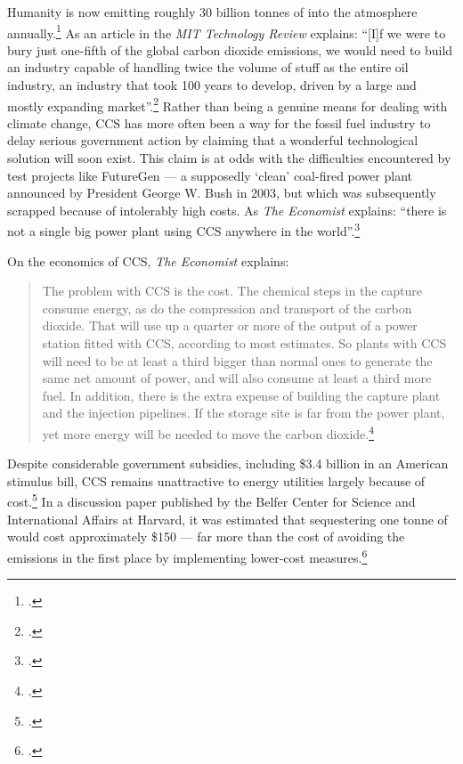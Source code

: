 \documentclass[10pt]{article}
\begin{document}
Humanity is now emitting roughly 30 billion tonnes of  into the atmosphere annually.\footcite[][]{RedrawingClimateEnergy}
As an article in the \emph{MIT Technology Review} explains: ``[I]f we were to bury just one-fifth of the global carbon dioxide emissions, we would need to build an industry capable of handling twice the volume of stuff as the entire oil industry, an industry that took 100 years to develop, driven by a large and mostly expanding market''.\footcite[][]{BullisonCCS}
Rather than being a genuine means for dealing with climate change, CCS has more often been a way for the fossil fuel industry to delay serious government action by claiming that a wonderful technological solution will soon exist.
This claim is at odds with the difficulties encountered by test projects like FutureGen --- a supposedly `clean' coal-fired power plant announced by President George W. Bush in 2003, but which was subsequently scrapped because of intolerably high costs.
As \emph{The Economist} explains: ``there is not a single big power plant using CCS anywhere in the world''.\footcite[][]{TroubleInStore}



On the economics of CCS, \emph{The Economist} explains:
\begin{quote}
The problem with CCS is the cost. The chemical steps in the capture consume energy, as do the compression and transport of the carbon dioxide. That will use up a quarter or more of the output of a power station fitted with CCS, according to most estimates. So plants with CCS will need to be at least a third bigger than normal ones to generate the same net amount of power, and will also consume at least a third more fuel. In addition, there is the extra expense of building the capture plant and the injection pipelines. If the storage site is far from the power plant, yet more energy will be needed to move the carbon dioxide.\footcite[][]{TroubleInStore}
\end{quote}
Despite considerable government subsidies, including \$3.4 billion in an American stimulus bill, CCS remains unattractive to energy utilities largely because of cost.\footcite[][]{IllusionCleanCoal}
In a discussion paper published by the Belfer Center for Science and International Affairs at Harvard, it was estimated that sequestering one tonne of  would cost approximately \$150 --- far more than the cost of avoiding the emissions in the first place by implementing lower-cost measures.\footcite[][]{RealisticCostsCarbonCapture}
\end{document}
